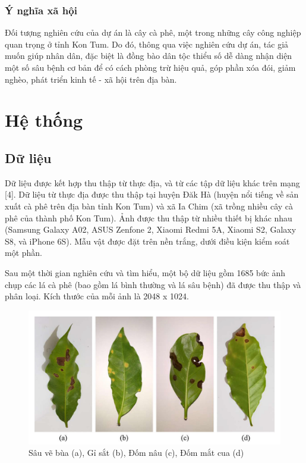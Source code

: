 \documentclass[a4paper,14pt]{extarticle}
\begin{document}
		\subsubsection{Ý nghĩa xã hội}
		Đối tượng nghiên cứu của dự án là cây cà phê, một trong những cây công nghiệp quan trọng ở tỉnh Kon Tum. Do đó, thông qua việc nghiên cứu dự án, tác giả muốn giúp nhân dân, đặc biệt là đồng bào dân tộc thiểu số dễ dàng nhận diện một số sâu bệnh cơ bản để có cách phòng trừ hiệu quả, góp phần xóa đói, giảm nghèo, phát triển kinh tế - xã hội trên địa bàn.

\section{Hệ thống}
	\subsection{Dữ liệu}
	Dữ liệu được kết hợp thu thập từ thực địa, và từ các tập dữ liệu khác trên mạng [4]. Dữ liệu từ thực địa được thu thập tại huyện Đăk Hà (huyện nổi tiếng về sản xuất cà phê trên địa bàn tỉnh Kon Tum) và xã Ia Chim (xã trồng nhiều cây cà phê của thành phố Kon Tum). Ảnh được thu thập từ nhiều thiết bị khác nhau (Samsung Galaxy A02, ASUS Zenfone 2, Xiaomi Redmi 5A, Xiaomi S2, Galaxy S8, và iPhone 6S). Mẫu vật được đặt trên nền trắng, dưới điều kiện kiểm soát một phần.

	Sau một thời gian nghiên cứu và tìm hiểu, một bộ dữ liệu gồm 1685 bức ảnh chụp các lá cà phê (bao gồm lá bình thường và lá sâu bệnh) đã được thu thập và phân loại. Kích thước của mỗi ảnh là 2048 x 1024.

	\begin{figure}[H]
		\centering
		\includegraphics[scale=0.35]{images/image1}
		\caption{Sâu vẽ bùa (a), Gỉ sắt (b), Đốm nâu (c), Đốm mắt cua (d)}
	\end{figure}
\end{document}
